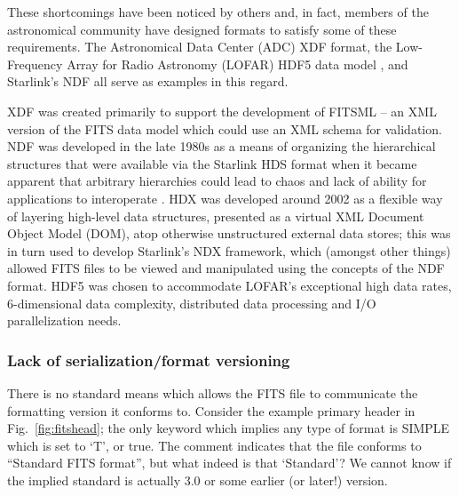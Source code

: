 \documentclass[final,authoryear,5p,times,twocolumn]{elsarticle}
\begin{document}
{{These shortcomings have been noticed by others and, in fact, members 
of the astronomical community have designed formats to satisfy some 
of these requirements. The Astronomical Data Center (ADC) XDF
format, the Low-Frequency Array for Radio Astronomy (LOFAR) HDF5 data
model \citep{2012ASPC..461..283A}, and Starlink's NDF
\citep{1988STARB...2...11C,1993ASPC...52..229W,P91_adassxxiii} all
serve as examples in this regard. 

XDF was created primarily to support
the development of FITSML -- an XML version of the FITS data model which
could use an XML schema for validation. NDF was developed in the late
1980s as a means of organizing the hierarchical structures that were
available via the Starlink HDS format when it became apparent that
arbitrary hierarchies could lead to chaos and lack of ability for
applications to interoperate \citep{2014Jenness}.
HDX \citep{2003ASPC..295..221G} was developed around 2002 as a flexible
way of layering high-level data structures, presented as a virtual XML
Document Object Model (DOM), atop otherwise unstructured external data stores; this was in
turn used to develop Starlink's NDX framework, which (amongst other
things) allowed FITS files to be viewed and manipulated using the
concepts of the NDF format.
HDF5 was chosen to accommodate LOFAR's
exceptional high data rates, 6-dimensional data complexity, distributed
data processing and I/O parallelization needs.


\subsubsection{Lack of serialization/format versioning}
\label{lack_of_serialization}


There is no standard means which allows the FITS file to
communicate the formatting version it conforms to.  Consider the example primary header
in Fig.~\ref{fig:fitshead}; the only keyword which implies any type of
format is SIMPLE which is set to `T', or true. The comment indicates that
the file conforms to ``Standard FITS format'', but what indeed is that `Standard'?
We cannot know if the implied standard is actually 3.0 or some earlier (or later!)
version.


}}
\end{document}
